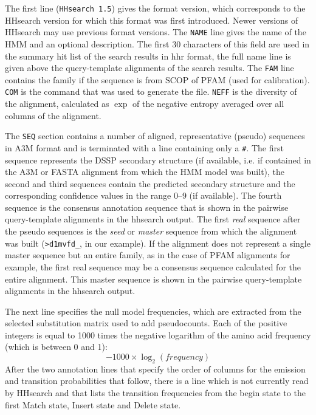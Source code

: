 \documentclass[11pt,a4paper]{article}
\begin{document}
The first line (\verb`HHsearch 1.5`) gives the format version, which corresponds to the HHsearch version for which this format was first introduced. Newer versions of HHsearch may use previous format versions. The \verb`NAME` line gives the name of the HMM and an optional description. The first 30 characters of this field are used in the summary hit list of the search results in hhr format, the full name line is given above the query-template alignments of the search results. The \verb`FAM` line contains the family if the sequence is from SCOP of PFAM (used for calibration). \verb`COM` is the command that was used to generate the file. \verb`NEFF` is the diversity of the alignment, calculated as $\exp$ of the negative entropy averaged over all columns of the alignment. 

The \verb`SEQ` section contains a number of aligned, representative (pseudo) sequences in A3M format and is terminated with a line containing only a \verb`#`. The first sequence represents the DSSP secondary structure (if available, i.e. if contained in the A3M or FASTA alignment from which the HMM model was built), the second and third sequences contain the predicted secondary structure and the corresponding confidence values in the range 0--9 (if available). The fourth sequence is the consensus annotation sequence that is shown in the pairwise query-template alignments in the hhsearch output. The first \emph{real} sequence after the pseudo sequences is the \emph{seed} or \emph{master} sequence from which the alignment was built (\verb`>d1mvfd_`, in our example). If the alignment does not represent a single master sequence but an entire family, as in the case of PFAM alignments for example, the first real sequence may be a consensus sequence calculated for the entire alignment. This master sequence is shown in the pairwise query-template alignments in the hhsearch output. 

The next line specifies the null model frequencies, which are extracted from the selected substitution matrix used to add pseudocounts. Each of the positive integers is equal to 1000 times the negative logarithm of the amino acid frequency (which is between 0 and 1):
\begin{equation}
  -1000 \times \log_2( frequency)
  \label{transformation}
\end{equation}
 After the two annotation lines that specify the order of columns for the emission and transition probabilities that follow, there is a line which is not currently read by HHsearch and that lists the transition frequencies from the begin state to the first Match state, Insert state and Delete state.
\end{document}
